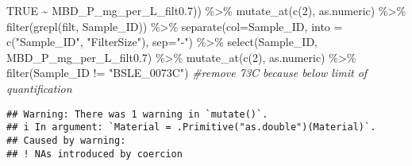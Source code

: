 \documentclass[
]{article}
\newenvironment{Shaded}{\begin{snugshade}}{\end{snugshade}}
\newcommand{\AttributeTok}[1]{\textcolor[rgb]{0.77,0.63,0.00}{#1}}
\newcommand{\CommentTok}[1]{\textcolor[rgb]{0.56,0.35,0.01}{\textit{#1}}}
\newcommand{\ConstantTok}[1]{\textcolor[rgb]{0.00,0.00,0.00}{#1}}
\newcommand{\DecValTok}[1]{\textcolor[rgb]{0.00,0.00,0.81}{#1}}
\newcommand{\FloatTok}[1]{\textcolor[rgb]{0.00,0.00,0.81}{#1}}
\newcommand{\FunctionTok}[1]{\textcolor[rgb]{0.00,0.00,0.00}{#1}}
\newcommand{\NormalTok}[1]{#1}
\newcommand{\SpecialCharTok}[1]{\textcolor[rgb]{0.00,0.00,0.00}{#1}}
\newcommand{\StringTok}[1]{\textcolor[rgb]{0.31,0.60,0.02}{#1}}
\begin{document}
\begin{Shaded}
\begin{Highlighting}[]
                \ConstantTok{TRUE} \SpecialCharTok{\textasciitilde{}}\NormalTok{ MBD\_P\_mg\_per\_L\_filt0}\FloatTok{.7}\NormalTok{)) }\SpecialCharTok{\%\textgreater{}\%}
  \FunctionTok{mutate\_at}\NormalTok{(}\FunctionTok{c}\NormalTok{(}\DecValTok{2}\NormalTok{), as.numeric) }\SpecialCharTok{\%\textgreater{}\%}
  \FunctionTok{filter}\NormalTok{(}\FunctionTok{grepl}\NormalTok{(}\StringTok{\textquotesingle{}filt\textquotesingle{}}\NormalTok{, Sample\_ID)) }\SpecialCharTok{\%\textgreater{}\%}
  \FunctionTok{separate}\NormalTok{(}\AttributeTok{col=}\NormalTok{Sample\_ID, }\AttributeTok{into =} \FunctionTok{c}\NormalTok{(}\StringTok{"Sample\_ID"}\NormalTok{, }\StringTok{"FilterSize"}\NormalTok{), }\AttributeTok{sep=}\StringTok{"{-}"}\NormalTok{) }\SpecialCharTok{\%\textgreater{}\%}
  \FunctionTok{select}\NormalTok{(Sample\_ID, MBD\_P\_mg\_per\_L\_filt0}\FloatTok{.7}\NormalTok{) }\SpecialCharTok{\%\textgreater{}\%}
  \FunctionTok{mutate\_at}\NormalTok{(}\FunctionTok{c}\NormalTok{(}\DecValTok{2}\NormalTok{), as.numeric) }\SpecialCharTok{\%\textgreater{}\%}
  \FunctionTok{filter}\NormalTok{(Sample\_ID }\SpecialCharTok{!=} \StringTok{"BSLE\_0073C"}\NormalTok{) }\CommentTok{\#remove 73C because below limit of quantification}
\end{Highlighting}
\end{Shaded}

\begin{verbatim}
## Warning: There was 1 warning in `mutate()`.
## i In argument: `Material = .Primitive("as.double")(Material)`.
## Caused by warning:
## ! NAs introduced by coercion
\end{verbatim}
\end{document}
